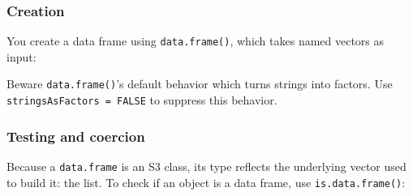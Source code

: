 \documentclass[]{book}
\newenvironment{Shaded}{\begin{snugshade}}{\end{snugshade}}
\newcommand{\KeywordTok}[1]{\textcolor[rgb]{0.13,0.29,0.53}{\textbf{#1}}}
\newcommand{\DataTypeTok}[1]{\textcolor[rgb]{0.13,0.29,0.53}{#1}}
\newcommand{\DecValTok}[1]{\textcolor[rgb]{0.00,0.00,0.81}{#1}}
\newcommand{\StringTok}[1]{\textcolor[rgb]{0.31,0.60,0.02}{#1}}
\newcommand{\CommentTok}[1]{\textcolor[rgb]{0.56,0.35,0.01}{\textit{#1}}}
\newcommand{\OtherTok}[1]{\textcolor[rgb]{0.56,0.35,0.01}{#1}}
\newcommand{\OperatorTok}[1]{\textcolor[rgb]{0.81,0.36,0.00}{\textbf{#1}}}
\newcommand{\NormalTok}[1]{#1}
\theoremstyle{definition}
\theoremstyle{definition}
\theoremstyle{definition}
\theoremstyle{remark}
\let\BeginKnitrBlock\begin \let\EndKnitrBlock\end
\begin{document}
\subsubsection{Creation}\label{creation}

You create a data frame using \texttt{data.frame()}, which takes named
vectors as input:

\begin{Shaded}
\end{Shaded}

\BeginKnitrBlock{rmdwarning}
Beware \texttt{data.frame()}'s default behavior which turns strings into
factors. Use \texttt{stringsAsFactors\ =\ FALSE} to suppress this
behavior.
\EndKnitrBlock{rmdwarning}

\begin{Shaded}
\end{Shaded}

\subsubsection{Testing and coercion}\label{testing-and-coercion}

Because a \texttt{data.frame} is an S3 class, its type reflects the
underlying vector used to build it: the list. To check if an object is a
data frame, use \texttt{is.data.frame()}:
\end{document}

